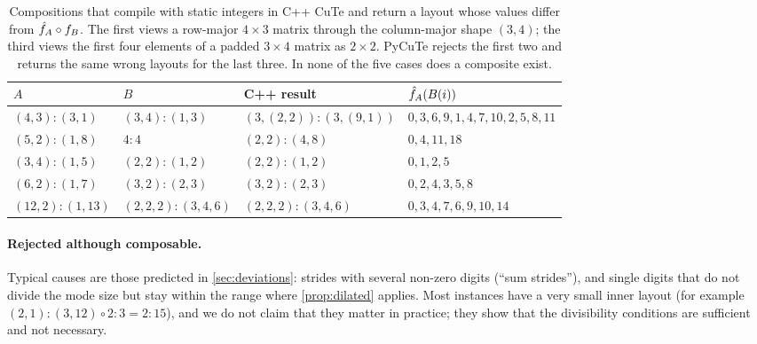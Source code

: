 \begin{table}[t]\centering\small
\begin{tabular}{@{}llll@{}}
\toprule
$A$ & $B$ & C++ result & $\hat{f}_{A}(B(i))$\\
\midrule
$(4,3):(3,1)$ & $(3,4):(1,3)$ & $(3,(2,2)):(3,(9,1))$ & $0,3,6,9,1,4,7,10,2,5,8,11$\\
$(5,2):(1,8)$ & $4:4$ & $(2,2):(4,8)$ & $0,4,11,18$\\
$(3,4):(1,5)$ & $(2,2):(1,2)$ & $(2,2):(1,2)$ & $0,1,2,5$\\
$(6,2):(1,7)$ & $(3,2):(2,3)$ & $(3,2):(2,3)$ & $0,2,4,3,5,8$\\
$(12,2):(1,13)$ & $(2,2,2):(3,4,6)$ & $(2,2,2):(3,4,6)$ & $0,3,4,7,6,9,10,14$\\
\bottomrule
\end{tabular}
\caption{Compositions that compile with static integers in C++ CuTe and return a layout whose
values differ from $\hat{f}_{A}\circ f_{B}$. The first views a row-major $4\times3$ matrix through the
column-major shape $(3,4)$; the third views the first four elements of a padded $3\times4$ matrix
as $2\times2$. PyCuTe rejects the first two and returns the same wrong layouts for the last
three. In none of the five cases does a composite exist.}\label{tab:examples}
\end{table}

\paragraph{Rejected although composable.}
Typical causes are those predicted in \cref{sec:deviations}: strides with several non-zero digits
(``sum strides''), and single digits that do not divide the mode size but stay within the range
where \cref{prop:dilated} applies. Most instances have a very small inner layout (for example
$(2,1):(3,12)\circ 2:3=2:15$), and we do not claim that they matter in practice; they show that
the divisibility conditions are sufficient and not necessary.

